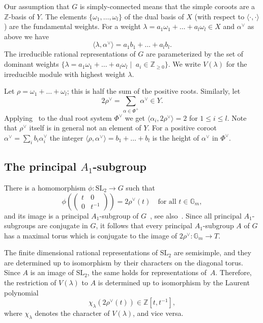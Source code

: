 \documentclass[11pt,a4paper]{article}
\theoremstyle{plain}
\theoremstyle{definition}
\newcommand{\Z}{\mathbb{Z}}
\newcommand{\SL}{\textrm{SL}}
\newcommand{\Gm}{\mathbb{G}_m}
\begin{document}
Our assumption that $G$ is simply-connected means that the simple coroots
are a $\Z$-basis of $Y$. The elements $\{\omega_1,\ldots, \omega_l\}$ of
the dual basis of $X$ (with respect to $\langle \cdot, \cdot \rangle$) are
the fundamental weights. For a weight $\lambda = a_1 \omega_1 + \ldots +
a_l \omega_l \in X$ and $\alpha^\vee$ as above we have
\[ \langle \lambda, \alpha^\vee\rangle = a_1 b_1 + \ldots + a_l b_l. \]
The irreducible rational representations of $G$ are parameterized by the
set of dominant weights $\{\lambda = a_1 \omega_1 + \ldots + a_l \omega_l
\mid\; a_i \in \Z_{\geq 0}\}$. We write $V(\lambda)$ for the irreducible 
module with highest weight $\lambda$.

Let $\rho = \omega_1 + \ldots + \omega_l$; this is half the sum of the
positive roots. Similarly, let 
\[ 2\rho^\vee = \sum_{\alpha \in \Phi^+} \alpha^\vee \in Y. \] 
Applying~\cite[Ch.~VI, \S1.10]{bou} to the dual root system $\Phi^\vee$ 
we get $\langle \alpha_i, 2\rho^\vee \rangle = 2$ for $1 \leq i \leq l$.
Note that $\rho^\vee$ itself is in general not an element of $Y$.
For a positive coroot $\alpha^\vee = \sum_i b_i \alpha_i^\vee$ the integer
$\langle \rho, \alpha^\vee \rangle = b_1 + \ldots + b_l$ is the height of
$\alpha^\vee$ in $\Phi^\vee$.

\subsection{The principal $A_1$-subgroup}\label{secPrincipal}

There is a homomorphism $\phi: \SL_2 \to G$ such that 
\[ \phi\left(\begin{pmatrix} t & 0 \\ 0 & t^{-1}\end{pmatrix}\right) 
   = 2\rho^\vee(t) \quad \textrm{for all } t \in \Gm, \]
and its image is a principal $A_1$-subgroup of 
$G$~\cite{siebenthal,dynkin,kostant}, see also~\cite[\S2.2]{serre}.
Since all principal $A_1$-subgroups are conjugate in $G$, it follows that
every principal $A_1$-subgroup $A$ of $G$ has a maximal torus which is
conjugate to the image of $2\rho^\vee: \Gm \to T$.

The finite dimensional rational representations of $\SL_2$ are semisimple,
and they are determined up to isomorphism by their characters on the
diagonal torus. Since $A$ is an image of $\SL_2$, the same holds for
representations of~$A$. Therefore, the restriction of $V(\lambda)$ to $A$ is
determined up to isomorphism by the Laurent polynomial
\[ \chi_\lambda(2\rho^\vee(t)) \in \Z[t, t^{-1}], \]
where $\chi_\lambda$ denotes the character of $V(\lambda)$, and vice
versa. 
\end{document}
